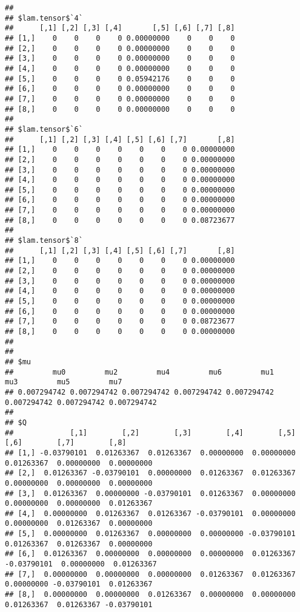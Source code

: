 \documentclass[
]{article}
\begin{document}
\begin{verbatim}
## 
## $lam.tensor$`4`
##      [,1] [,2] [,3] [,4]       [,5] [,6] [,7] [,8]
## [1,]    0    0    0    0 0.00000000    0    0    0
## [2,]    0    0    0    0 0.00000000    0    0    0
## [3,]    0    0    0    0 0.00000000    0    0    0
## [4,]    0    0    0    0 0.00000000    0    0    0
## [5,]    0    0    0    0 0.05942176    0    0    0
## [6,]    0    0    0    0 0.00000000    0    0    0
## [7,]    0    0    0    0 0.00000000    0    0    0
## [8,]    0    0    0    0 0.00000000    0    0    0
## 
## $lam.tensor$`6`
##      [,1] [,2] [,3] [,4] [,5] [,6] [,7]       [,8]
## [1,]    0    0    0    0    0    0    0 0.00000000
## [2,]    0    0    0    0    0    0    0 0.00000000
## [3,]    0    0    0    0    0    0    0 0.00000000
## [4,]    0    0    0    0    0    0    0 0.00000000
## [5,]    0    0    0    0    0    0    0 0.00000000
## [6,]    0    0    0    0    0    0    0 0.00000000
## [7,]    0    0    0    0    0    0    0 0.00000000
## [8,]    0    0    0    0    0    0    0 0.08723677
## 
## $lam.tensor$`8`
##      [,1] [,2] [,3] [,4] [,5] [,6] [,7]       [,8]
## [1,]    0    0    0    0    0    0    0 0.00000000
## [2,]    0    0    0    0    0    0    0 0.00000000
## [3,]    0    0    0    0    0    0    0 0.00000000
## [4,]    0    0    0    0    0    0    0 0.00000000
## [5,]    0    0    0    0    0    0    0 0.00000000
## [6,]    0    0    0    0    0    0    0 0.00000000
## [7,]    0    0    0    0    0    0    0 0.08723677
## [8,]    0    0    0    0    0    0    0 0.00000000
## 
## 
## $mu
##         mu0         mu2         mu4         mu6         mu1         mu3         mu5         mu7 
## 0.007294742 0.007294742 0.007294742 0.007294742 0.007294742 0.007294742 0.007294742 0.007294742 
## 
## $Q
##             [,1]        [,2]        [,3]        [,4]        [,5]        [,6]        [,7]        [,8]
## [1,] -0.03790101  0.01263367  0.01263367  0.00000000  0.00000000  0.01263367  0.00000000  0.00000000
## [2,]  0.01263367 -0.03790101  0.00000000  0.01263367  0.01263367  0.00000000  0.00000000  0.00000000
## [3,]  0.01263367  0.00000000 -0.03790101  0.01263367  0.00000000  0.00000000  0.00000000  0.01263367
## [4,]  0.00000000  0.01263367  0.01263367 -0.03790101  0.00000000  0.00000000  0.01263367  0.00000000
## [5,]  0.00000000  0.01263367  0.00000000  0.00000000 -0.03790101  0.01263367  0.01263367  0.00000000
## [6,]  0.01263367  0.00000000  0.00000000  0.00000000  0.01263367 -0.03790101  0.00000000  0.01263367
## [7,]  0.00000000  0.00000000  0.00000000  0.01263367  0.01263367  0.00000000 -0.03790101  0.01263367
## [8,]  0.00000000  0.00000000  0.01263367  0.00000000  0.00000000  0.01263367  0.01263367 -0.03790101
\end{verbatim}
\end{document}
